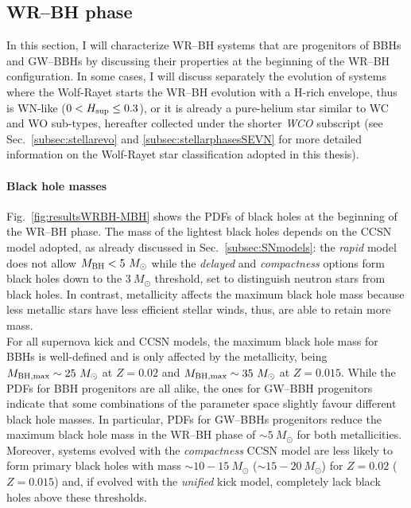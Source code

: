 \documentclass[a4paper,titlepage]{book}     	%
\newcommand{\sun}{\ensuremath{_\odot}}
\newcommand{\msun}{\ensuremath{M\sun}}
\newcommand{\mbh}{\ensuremath{M_\textup{BH}}}
\begin{document}
\subsection{WR--BH phase}\label{subsec:WRBHphaseBBHsGWBBHs}
In this section, I will characterize WR--BH systems that are progenitors of BBHs and GW--BBHs by discussing their properties at the beginning of the WR--BH configuration. In some cases, I will discuss separately the evolution of systems where the Wolf-Rayet starts the WR--BH evolution with a H-rich envelope, thus is WN-like ($0 < H_{\rm sup} \leq 0.3$), or it is already a pure-helium star similar to WC and WO sub-types, hereafter collected under the shorter \emph{WCO} subscript (see Sec.\ \ref{subsec:stellarevo} and \ref{subsec:stellarphasesSEVN} for more detailed information on the Wolf-Rayet star classification adopted in this thesis).


\paragraph{Black hole masses} Fig.\ \ref{fig:resultsWRBH-MBH} shows the PDFs of black holes at the beginning of the WR--BH phase. The mass of the lightest black holes depends on the CCSN model adopted, as already discussed in Sec.\ \ref{subsec:SNmodels}: the \emph{rapid} model does not allow $\mbh < 5~\msun$ while the \emph{delayed} and \emph{compactness} options form black holes down to the $3~\msun$ threshold, set to distinguish neutron stars from black holes. In contrast, metallicity affects the maximum black hole mass because less metallic stars have less efficient stellar winds, thus, are able to retain more mass. \\

For all supernova kick and CCSN models, the maximum black hole mass for BBHs is well-defined and is only affected by the metallicity, being $M_{\rm BH,max} \sim 25~\msun$ at $Z=0.02$ and $M_{\rm BH,max} \sim 35~\msun$ at $Z=0.015$. While the PDFs for BBH progenitors are all alike, the ones for GW--BBH progenitors indicate that some combinations of the parameter space slightly favour different black hole masses. In particular, PDFs for GW--BBHs progenitors reduce the maximum black hole mass in the WR--BH phase of $\sim 5~\msun$ for both metallicities. Moreover, systems evolved with the \emph{compactness} CCSN model are less likely to form primary black holes with mass $\sim 10-15~\msun$ ($\sim 15-20~\msun$) for $Z=0.02$ ($Z=0.015$) and, if evolved with the \emph{unified} kick model, completely lack black holes above these thresholds.
\end{document}
